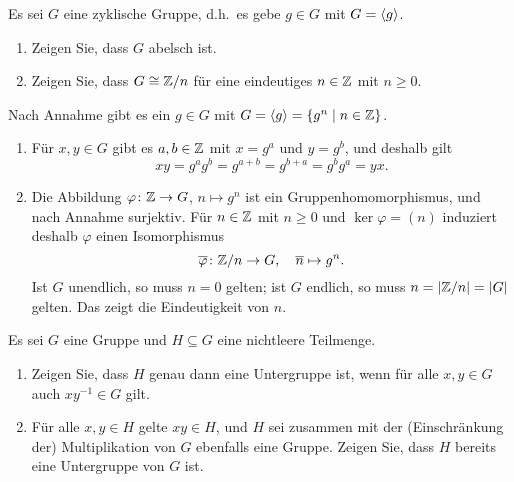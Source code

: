 \begin{question}[subtitle = Klassifikation zyklischer Gruppen]
  Es sei $G$ eine zyklische Gruppe, d.h.\ es gebe $g \in G$ mit $G = \langle g\rangle$.
  \begin{enumerate}
    \item
      Zeigen Sie, dass $G$ abelsch ist.
    \item
      Zeigen Sie, dass $G \cong \mathbb{Z}/n$ für eine eindeutiges $n \in \mathbb{Z}$ mit $n \geq 0$.
  \end{enumerate}
\end{question}


\begin{solution}
  \label{question: classification of cyclic groups}
  Nach Annahme gibt es ein $g \in G$ mit $G = \langle g\rangle = \{g^n \mid n \in \mathbb{Z}\}$.
  \begin{enumerate}
    \item
      Für $x, y \in G$ gibt es $a, b \in \mathbb{Z}$ mit $x = g^a$ und $y = g^b$, und deshalb gilt
      \[
        xy = g^a g^b = g^{a+b} = g^{b+a} = g^b g^a = yx.
      \]
      
    \item
      Die Abbildung $\varphi \colon \mathbb{Z} \to G$, $n \mapsto g^n$ ist ein Gruppenhomomorphismus, und nach Annahme surjektiv.
      Für $n \in \mathbb{Z}$ mit $n \geq 0$ und $\ker \varphi = (n)$ induziert deshalb $\varphi$ einen Isomorphismus
      \[
        \overline{\varphi} \colon \mathbb{Z}/n \to G,
        \quad
        \overline{n} \mapsto g^n.
      \]
      Ist $G$ unendlich, so muss $n = 0$ gelten;
      ist $G$ endlich, so muss $n = |\mathbb{Z}/n| = |G|$ gelten.
      Das zeigt die Eindeutigkeit von $n$.
  \end{enumerate}
\end{solution}


\begin{question}[subtitle = Zur Definition von Untergruppen]
  Es sei $G$ eine Gruppe und $H \subseteq G$ eine nichtleere Teilmenge.
  \begin{enumerate}
    \item
      Zeigen Sie, dass $H$ genau dann eine Untergruppe ist, wenn für alle $x, y \in G$ auch $x y^{-1} \in G$ gilt.
    \item
      Für alle $x, y \in H$ gelte $xy \in H$, und $H$ sei zusammen mit der (Einschränkung der) Multiplikation von $G$ ebenfalls eine Gruppe.
      Zeigen Sie, dass $H$ bereits eine Untergruppe von $G$ ist.
  \end{enumerate}
\end{question}


